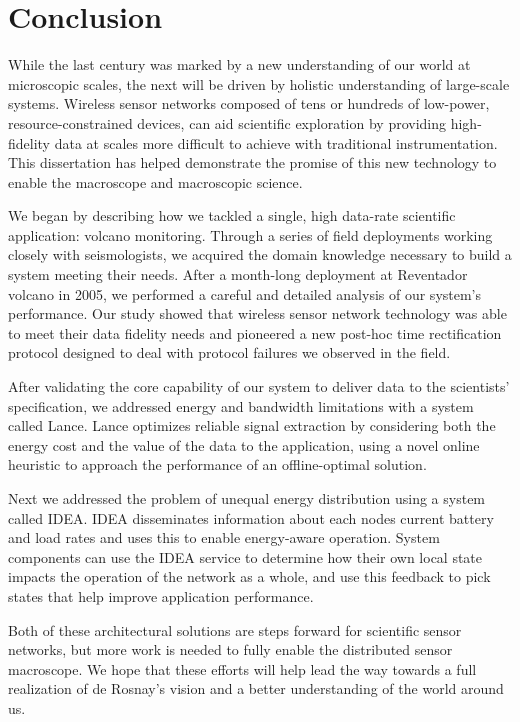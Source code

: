 \chapter{Conclusion}
\label{chapter-conclusion}

While the last century was marked by a new understanding of our world at
microscopic scales, the next will be driven by holistic understanding of
large-scale systems. Wireless sensor networks composed of tens or hundreds
of low-power, resource-constrained devices, can aid scientific exploration by
providing high-fidelity data at scales more difficult to achieve with
traditional instrumentation. This dissertation has helped demonstrate the
promise of this new technology to enable the macroscope and macroscopic
science.

We began by describing how we tackled a single, high data-rate scientific
application: volcano monitoring. Through a series of field deployments
working closely with seismologists, we acquired the domain knowledge
necessary to build a system meeting their needs. After a month-long
deployment at Reventador volcano in 2005, we performed a careful and detailed
analysis of our system's performance. Our study showed that wireless sensor
network technology was able to meet their data fidelity needs and pioneered a
new post-hoc time rectification protocol designed to deal with protocol
failures we observed in the field.

After validating the core capability of our system to deliver data to the
scientists' specification, we addressed energy and bandwidth limitations with
a system called Lance. Lance optimizes reliable signal extraction by
considering both the energy cost and the value of the data to the
application, using a novel online heuristic to approach the performance of an
offline-optimal solution.

Next we addressed the problem of unequal energy distribution using a system
called IDEA. IDEA disseminates information about each nodes current battery
and load rates and uses this to enable energy-aware operation. System
components can use the IDEA service to determine how their own local state
impacts the operation of the network as a whole, and use this feedback to
pick states that help improve application performance.

Both of these architectural solutions are steps forward for scientific sensor
networks, but more work is needed to fully enable the distributed sensor
macroscope. We hope that these efforts will help lead the way towards a full
realization of de Rosnay's vision and a better understanding of the world
around us.
